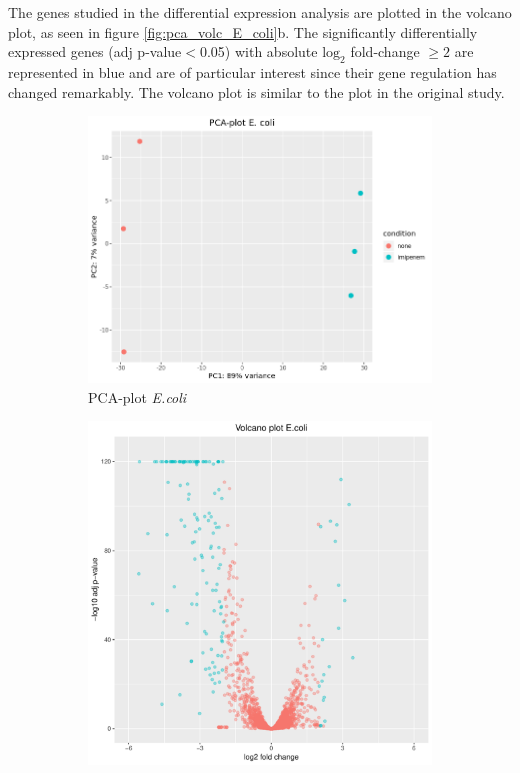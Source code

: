 The genes studied in the differential expression analysis are plotted in the volcano plot, as seen in figure \ref{fig:pca_volc_E_coli}b. The significantly differentially expressed genes (adj p-value$<$0.05) with absolute $\mathrm{log}_2$ fold-change $\geq2$ are represented in blue and are of particular interest since their gene regulation has changed remarkably. The volcano plot is similar to the plot in the original study.

\begin{figure}[ht]
    \centering
    \begin{subfigure}{0.47\textwidth}
        \includegraphics[width=0.9\linewidth]{Figures/PCA_E_coli2.png}
        \caption{PCA-plot \textit{E.coli}}
        \end{subfigure}
    \begin{subfigure}{0.47\textwidth}
        \includegraphics[width=0.9\linewidth]{Figures/Volcano_E_coli.pdf}

\end{subfigure}
\end{figure}
